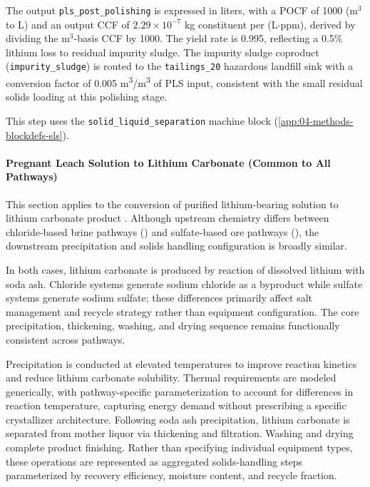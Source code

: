 The output \texttt{pls\_post\_polishing} is expressed in liters, with a POCF of 1000 (m$^3$ to L) and an output CCF of $2.29 \times 10^{-7}$ kg constituent per (L$\cdot$ppm), derived by dividing the m$^3$-basis CCF by 1000. The yield rate is 0.995, reflecting a 0.5\% lithium loss to residual impurity sludge. The impurity sludge coproduct (\texttt{impurity\_sludge}) is routed to the \texttt{tailings\_20} hazardous landfill sink with a conversion factor of 0.005 m\textsuperscript{3}/m\textsuperscript{3} of PLS input, consistent with the small residual solids loading at this polishing stage.

This step uses the \texttt{solid\_liquid\_separation} machine block (\ref{app:04-methods-blockdefs-sls}).

\paragraph{Pregnant Leach Solution to Lithium Carbonate (Common to All Pathways)}\label{app:04-methods-facilitychoices-pls}

This section applies to the conversion of purified lithium-bearing solution to lithium carbonate product \citep{srkconsultingSECTechnicalReport2023a, chordiaLifeCycleEnvironmental2022}. Although upstream chemistry differs between chloride-based brine pathways () and sulfate-based ore pathways (), the downstream precipitation and solids handling configuration is broadly similar.

In both cases, lithium carbonate is produced by reaction of dissolved lithium with soda ash. Chloride systems generate sodium chloride as a byproduct while sulfate systems generate sodium sulfate; these differences primarily affect salt management and recycle strategy rather than equipment configuration. The core precipitation, thickening, washing, and drying sequence remains functionally consistent across pathways.

Precipitation is conducted at elevated temperatures to improve reaction kinetics and reduce lithium carbonate solubility. Thermal requirements are modeled generically, with pathway-specific parameterization to account for differences in reaction temperature, capturing energy demand without prescribing a specific crystallizer architecture. Following soda ash precipitation, lithium carbonate is separated from mother liquor via thickening and filtration. Washing and drying complete product finishing. Rather than specifying individual equipment types, these operations are represented as aggregated solids-handling steps parameterized by recovery efficiency, moisture content, and recycle fraction.

